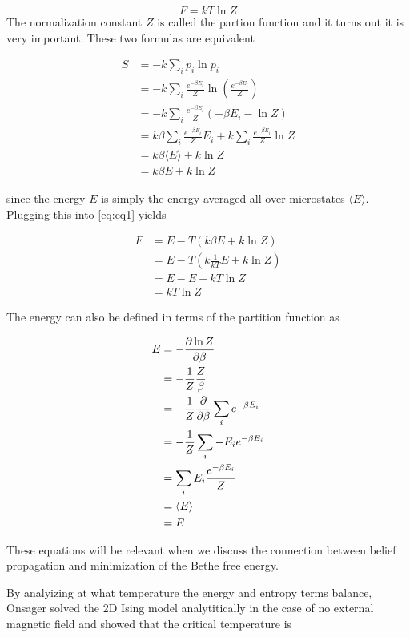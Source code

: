 \documentclass{article}
\begin{document}
\begin{equation}
    F = kT \ln Z
\end{equation}
The normalization constant $Z$ is called the partion function and it turns out it is very important. These two formulas are equivalent


\begin{align}
    S &= -k \sum_i p_i \ln p_i \\
    &= -k \sum_i \frac{e^{-\beta E_i}}{Z} \ln \left(\frac{e^{-\beta E_i}}{Z} \right) \\
    &= -k \sum_i \frac{e^{-\beta E_i}}{Z} (-\beta E_i - \ln Z) \\
    &= k \beta \sum_i \frac{e^{-\beta E_i}}{Z} E_i + k \sum_i \frac{e^{-\beta E_i}}{Z} \ln Z \\
    &= k \beta \langle E \rangle + k \ln Z \\
    &= k \beta E + k \ln Z
\end{align}

since the energy $E$ is simply the energy averaged all over microstates $\langle E \rangle$. 
Plugging this into \eqref{eq:eq1} yields

\begin{align}
    F &= E - T (k \beta E + k \ln Z) \\
    &= E - T (k \frac{1}{kT} E + k \ln Z) \\
    &= E - E + kT \ln Z \\
    &= kT \ln Z
\end{align}

The energy can also be defined in terms of the partition function as

\begin{align}
    E &= -\pdv{\ln Z}{\beta} \\
    &= -\frac{1}{Z} \frac{Z}{\beta} \\
    &= -\frac{1}{Z} \pdv{}{\beta} \sum_i e^{-\beta E_i} \\
    &= -\frac{1}{Z} \sum_i -E_i e^{-\beta E_i} \\
    &= \sum_i E_i \frac{e^{-\beta E_i}}{Z} \\
    &= \langle E \rangle \\
    &= E 
\end{align}

These equations will be relevant when we discuss the connection between belief propagation and minimization of the Bethe free energy.

By analyizing at what temperature the energy and entropy terms balance, Onsager solved the 2D Ising model analytitically in the case of no external magnetic field and showed that the critical temperature is
\end{document}
